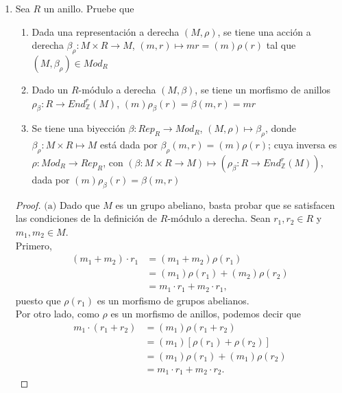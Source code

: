 \documentclass{article}
\newcommand{\lrprth}[1]{
	\left(#1\right)
}
\newcommand{\zend}[2]{
	End_{\mathbb{Z}}^{#2}\lrprth{#1}
}
\theoremstyle{definition}
\theoremstyle{plain}
\theoremstyle{plain}
\theoremstyle{definition}
\theoremstyle{definition}
\theoremstyle{definition}
\theoremstyle{definition}
\theoremstyle{definition}
\theoremstyle{definition}
\begin{document}
\begin{enumerate}[label=\textbf{Ej \arabic*.}]
		\item Sea $R$ un anillo. Pruebe que
		\begin{enumerate}
			\item Dada una representación a derecha $\lrprth{M, \rho}$, se tiene una acción a derecha $\beta_{\rho} : M \times R \longrightarrow M$, $\lrprth{m,r} \mapsto mr=\lrprth{m}\rho\lrprth{r}$ tal que $\lrprth{M, \beta_{\rho}}\in Mod_{R}$
			\item Dado un $R$-módulo a derecha $\lrprth{M, \beta}$, se tiene un morfismo de anillos $\rho_{\beta}:R \longrightarrow \zend{M}{r}$, $\lrprth{m}\rho_{\beta}\lrprth{r}=\beta\lrprth{m,r}=mr$
			\item Se tiene una biyección $\beta :Rep_{R} \longrightarrow Mod_{R}$, $\lrprth{M, \rho}\mapsto\beta_{\rho}$, donde $\beta_{\rho}:M \times R \mapsto M$ está dada por $\beta_{\rho}\lrprth{m,r}=\lrprth{m}\rho\lrprth{r}$; cuya inversa es $\rho :Mod_{R} \longrightarrow Rep_{R}$, con $\lrprth{\beta :M \times R \longrightarrow M}\mapsto\lrprth{\rho_{\beta}:R \longrightarrow\zend{M}{r}}$, dada por $\lrprth{m}\rho_{\beta}\lrprth{r}=\beta\lrprth{m,r}$
		\end{enumerate}
		\begin{proof}
			$\boxed{\text{(a)}}$ Dado que $M$ es un grupo abeliano, basta probar que se satisfacen las condiciones de la definición de $R$-módulo a derecha. Sean $r_{1},r_{2} \in R$ y $m_{1},m_{2} \in M$.\\
			
			Primero,
			\begin{align*}
				\lrprth{m_{1}+m_{2}} \cdot r_{1}&=\lrprth{m_{1}+m_{2}}\rho\lrprth{r_{1}}\\
				&=\lrprth{m_{1}} \rho \lrprth{r_{1}} + \lrprth{m_{2}} \rho \lrprth{r_{2}}\\
				&=m_{1} \cdot r_{1} + m_{2} \cdot r_{1},
			\end{align*}
			puesto que $\rho \lrprth{r_{1}}$ es un morfismo de grupos abelianos.\\
			
			Por otro lado, como $\rho$ es un morfismo de anillos, podemos decir que
			\begin{align*}
				m_{1} \cdot \lrprth{r_{1}+r_{2}}&=\lrprth{m_{1}} \rho \lrprth{r_{1}+r_{2}}\\
				&=\lrprth{m_{1}}[\rho \lrprth{r_{1}} + \rho \lrprth{r_{2}}]\\
				&=\lrprth{m_{1}} \rho \lrprth{r_{1}} + \lrprth{m_{1}} \rho \lrprth{r_{2}}\\
				&=m_{1} \cdot r_{1} + m_{2} \cdot r_{2}.
			\end{align*}
			

\end{proof}
\end{enumerate}
\end{document}
